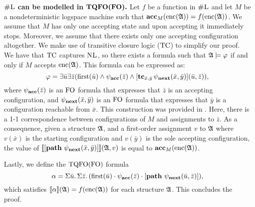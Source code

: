 \vspace{1em}
$\boldsymbol{\text{\sc \#L}}$ {\bf can be modelled in }$\boldsymbol{{\rm TQFO}({\rm FO}).}$ Let $f$ be a function in $\text{\sc \#L}$ and let $M$ be a nondeterministic logspace machine such that $\textbf{acc}_{M}({\rm enc}(\mathfrak{A})) = f({\rm enc}(\mathfrak{A}))$. We assume that $M$ has only one accepting state and upon accepting it immediately stops. Moreover, we assume that there exists only one accepting configuration altogether. We make use of transitive closure logic (${\rm TC}$) to simplify our proof. We have that ${\rm TC}$ captures $\text{\sc NL}$\cite{I83}, so there exists a formula such that $\mathfrak{A}\models\varphi$ if and only if $M$ accepts ${\rm enc}(\mathfrak{A})$. This formula can be expressed as:
$$
\varphi = \exists\bar{u}\exists\bar{z}(\operatorname{first}(\bar{u})\wedge \psi_{\bf acc}(\bar{z})\wedge[{\bf tc}_{\bar{x},\bar{y}}\,\psi_{\bf next}(\bar{x},\bar{y})](\bar{u},\bar{z})),
$$
where $\psi_{\bf acc}(\bar{z})$ is an ${\rm FO}$ formula that expresses that $\bar{z}$ is an accepting configuration, and $\psi_{\bf next}(\bar{x},\bar{y})$ is an ${\rm FO}$ formula that expresses that $\bar{y}$ is a configuration reachable from $\bar{x}$. This construction was provided in \cite{G07}. Here, there is a 1-1 correspondence between configurations of $M$ and assignments to $\bar{z}$. As a consequence, given a structure $\mathfrak{A}$, and a first-order assignment $v$ to $\mathfrak{A}$ where $v(\bar{x})$ is the starting configuration and $v(\bar{y})$ is the sole accepting configuration, the value of ${\llbracket{}{[{\bf path} \,\, \psi_{\bf next}(\bar{x},\bar{y})]}\rrbracket}(\mathfrak{A},v)$ is equal to $\textbf{acc}_M({\rm enc}(\mathfrak{A}))$.

Lastly, we define the ${\rm TQFO}({\rm FO})$ formula
$$
\alpha = \Sigma{\bar{u}}.\,\Sigma{\bar{z}}.\,(\operatorname{first}(\bar{u})\cdot\psi_{\bf acc}(\bar{z})\cdot[{\bf path} \,\, \psi_{\bf next}(\bar{u},\bar{z})]),
$$
which satisfies ${\llbracket{}{\alpha}\rrbracket}(\mathfrak{A}) = f({\rm enc}(\mathfrak{A}))$ for each structure $\mathfrak{A}$. This concludes the proof.


